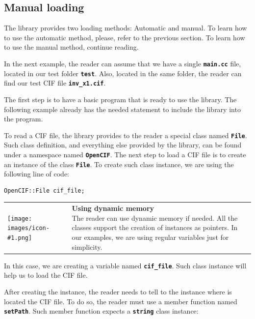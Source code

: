 \documentclass[11pt,twoside,openany,x11names,svgnames]{memoir}
\makeatletter
\newcommand{\IconNote}[3]
{
	\begin{table}[ht]
	\begin{tabular}{ lm{\dimexpr\textwidth-8\tabcolsep-\wd0}@{}}
		\toprule
		\texttt{[image: images/icon-\#1.png]}
		&
		\parbox[t]{155mm}{
		\textbf{#2} \\
		#3
		}
	\end{tabular}
\end{table}
}
\makeatother
\begin{document}
\subsection{Manual loading}\label{Manual-loading}

The library provides two loading methods: Automatic and manual. To learn how to use the automatic method, please, refer to the previous section. To learn how to use the manual method, continue reading.

In the next example, the reader can assume that we have a single \textbf{\texttt{main.cc}} file, located in our test folder \textbf{\texttt{test}}. Also, located in the same folder, the reader can find our test CIF file \textbf{\texttt{inv\_x1.cif}}.

The first step is to have a basic program that is ready to use the library. The following example already has the needed statement to include the library into the program.



To read a CIF file, the library provides to the reader a special class named \textbf{\texttt{File}}. Such class definition, and everything else provided by the library, can be found under a namespace named \textbf{\texttt{OpenCIF}}. The next step to load a CIF file is to create an instance of the class \textbf{\texttt{File}}. To create such class instance, we are using the following line of code:

\begin{lstlisting}[frame=single,style=CPPStyle]
OpenCIF::File cif_file;
\end{lstlisting}

\IconNote
	{info}
	{Using dynamic memory}
	{The reader can use dynamic memory if needed. All the classes support the creation of instances as pointers. In our examples, we are using regular variables just for simplicity.}

In this case, we are creating a variable named \textbf{\texttt{cif\_file}}. Such class instance will help us to load the CIF file.

After creating the instance, the reader needs to tell to the instance where is located the CIF file. To do so, the reader must use a member function named \textbf{\texttt{setPath}}. Such member function expects a \textbf{\texttt{string}} class instance:
\end{document}
